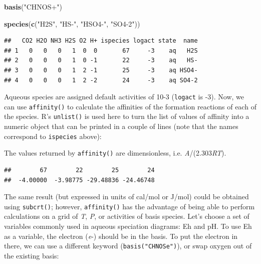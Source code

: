 \documentclass[]{tufte-handout}
\newenvironment{Shaded}{}{}
\newcommand{\KeywordTok}[1]{\textcolor[rgb]{0.00,0.44,0.13}{\textbf{#1}}}
\newcommand{\StringTok}[1]{\textcolor[rgb]{0.25,0.44,0.63}{#1}}
\newcommand{\OperatorTok}[1]{\textcolor[rgb]{0.40,0.40,0.40}{#1}}
\newcommand{\NormalTok}[1]{#1}
\begin{document}
\begin{Shaded}
\begin{Highlighting}[]
\KeywordTok{basis}\NormalTok{(}\StringTok{"CHNOS+"}\NormalTok{)}
\end{Highlighting}
\end{Shaded}

\begin{Shaded}
\begin{Highlighting}[]
\KeywordTok{species}\NormalTok{(}\KeywordTok{c}\NormalTok{(}\StringTok{"H2S"}\NormalTok{, }\StringTok{"HS-"}\NormalTok{, }\StringTok{"HSO4-"}\NormalTok{, }\StringTok{"SO4-2"}\NormalTok{))}
\end{Highlighting}
\end{Shaded}

\begin{verbatim}
##   CO2 H2O NH3 H2S O2 H+ ispecies logact state  name
## 1   0   0   0   1  0  0       67     -3    aq   H2S
## 2   0   0   0   1  0 -1       22     -3    aq   HS-
## 3   0   0   0   1  2 -1       25     -3    aq HSO4-
## 4   0   0   0   1  2 -2       24     -3    aq SO4-2
\end{verbatim}

Aqueous species are assigned default activities of 10-3 (\texttt{logact}
is -3). Now, we can use {\texttt{affinity()}} to calculate the
affinities of the formation reactions of each of the species. R's
\texttt{unlist()} is used here to turn the list of values of affinity
into a numeric object that can be printed in a couple of lines (note
that the names correspond to \texttt{ispecies} above):

\begin{marginfigure}
The values returned by {\texttt{affinity()}} are dimensionless, i.e.
\emph{A}/(2.303\emph{RT}).
\end{marginfigure}

\begin{Shaded}
\end{Shaded}

\begin{verbatim}
##        67        22        25        24 
##  -4.00000  -3.98775 -29.48836 -24.46748
\end{verbatim}

The same result (but expressed in units of cal/mol or J/mol) could be
obtained using {\texttt{subcrt()}}; however, {\texttt{affinity()}} has
the advantage of being able to perform calculations on a grid of
\emph{T}, \emph{P}, or activities of basis species. Let's choose a set
of variables commonly used in aqueous speciation diagrams: Eh and pH. To
use Eh as a variable, the electron (\emph{e}-) should be in the basis.
To put the electron in there, we can use a different keyword
({\texttt{basis("CHNOSe")}}), or swap oxygen out of the existing basis:
\end{document}
